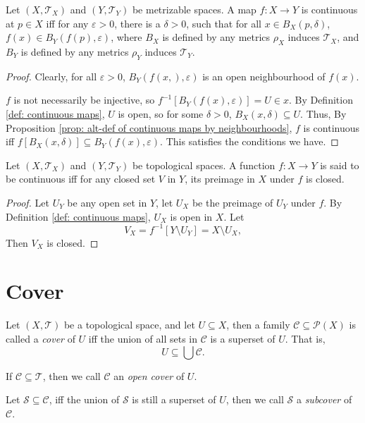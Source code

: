 \begin{proposition}
	Let $(X, \mathcal T_X)$ and $(Y, \mathcal T_{Y})$ be metrizable spaces. A map $f: X \to Y$ is continuous at $p \in X$ iff for any $\varepsilon > 0$, there is a $\delta > 0$, such that for all $x \in B_X(p, \delta)$, $f(x) \in B_Y(f(p), \varepsilon)$, where $B_X$ is defined by any metrics $\rho_X$ induces $\mathcal T_X$, and $B_Y$ is defined by any metrics $\rho_Y$ induces $\mathcal T_Y$.
	
	\begin{proof}
		Clearly, for all $\varepsilon > 0$, $B_Y(f(x,), \varepsilon)$ is an open neighbourhood of $f(x)$.
		
		$f$ is not necessarily be injective, so $f^{-1}[B_Y(f(x), \varepsilon)] = U \in x$. By Definition \ref{def: continuous maps}, $U$ is open, so for some $\delta > 0$, $B_X(x, \delta) \subseteq U$. Thus, By Proposition \ref{prop: alt-def of continuous maps by neighbourhoods}, $f$ is continuous iff $f[B_X(x, \delta)] \subseteq B_Y(f(x), \varepsilon)$. This satisfies the conditions we have.
	\end{proof}
\end{proposition}


\begin{proposition}
	Let $(X, \mathcal T_X)$ and $(Y, \mathcal T_Y)$ be topological spaces. A function $f: X \to Y$ is said to be continuous iff for any closed set $V$ in $Y$, its preimage in $X$ under $f$ is closed.
	
	\begin{proof}
		Let $U_Y$ be any open set in $Y$, let $U_X$ be the preimage of $U_Y$ under $f$. By Definition \ref{def: continuous maps}, $U_X$ is open in $X$. Let
		$$
		V_X = f^{-1}[Y \setminus U_Y] = X \setminus U_X,
		$$
		Then $V_X$ is closed.
	\end{proof}
\end{proposition}



\section{Cover}


\begin{definition}
	[cover]
	\label{def: cover}
	Let $(X, \mathcal T)$ be a topological space, and let $U \subseteq X$, then a family $\mathcal C \subseteq \mathcal P(X)$ is called a \textit{cover} of $U$ iff the union of all sets in $\mathcal C$ is a superset of $U$. That is,
	$$
	U \subseteq \bigcup \mathcal C.
	$$
	
	If $\mathcal C \subseteq \mathcal T$, then we call $\mathcal C$ an \textit{open cover} of $U$.
	
	Let $\mathcal S \subseteq \mathcal C$, iff the union of $\mathcal S$ is still a superset of $U$, then we call $\mathcal S$ a \textit{subcover} of $\mathcal C$.
\end{definition}


